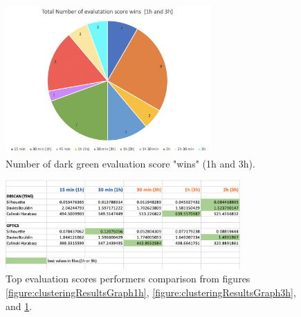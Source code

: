 

\begin{figure}
  \centering
  \includegraphics[width=0.7\textwidth]{./images/clusteringResults/clusteringResultsGraphTotal.png}
  \caption{Number of dark green evaluation score "wins" (1h and 3h).}
  \label{figure:clusteringResultsGraphTotal}
\end{figure}









\begin{figure}
  \centering
  \includegraphics[width=0.8\textwidth]{./images/clusteringResults/clusteringResults8.png}
  \caption{Top evaluation scores performers comparison from figures \ref{figure:clusteringResultsGraph1h}, \ref{figure:clusteringResultsGraph3h}, and \ref{figure:clusteringResultsGraphTotal}.}
  \label{figure:clusteringResults8}
\end{figure}

\clearpage
